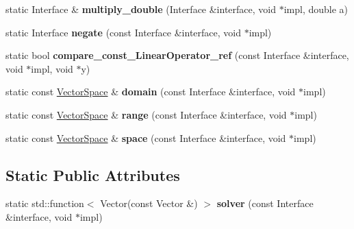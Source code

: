 \begin{DoxyCompactItemize}
\item 
\hypertarget{structSpacy_1_1LinearOperatorDetail_1_1execution__wrapper_a93d0107c1b355db394bc23307cb09781}{static \-Interface \& {\bfseries multiply\-\_\-double} (\-Interface \&interface, void $\ast$impl, double a)}\label{structSpacy_1_1LinearOperatorDetail_1_1execution__wrapper_a93d0107c1b355db394bc23307cb09781}

\item 
\hypertarget{structSpacy_1_1LinearOperatorDetail_1_1execution__wrapper_a039695797eecc3ae987476ab6671ec73}{static \-Interface {\bfseries negate} (const \-Interface \&interface, void $\ast$impl)}\label{structSpacy_1_1LinearOperatorDetail_1_1execution__wrapper_a039695797eecc3ae987476ab6671ec73}

\item 
\hypertarget{structSpacy_1_1LinearOperatorDetail_1_1execution__wrapper_a76b4beabb432d9d44b00b3101b0916cd}{static bool {\bfseries compare\-\_\-const\-\_\-\-Linear\-Operator\-\_\-ref} (const \-Interface \&interface, void $\ast$impl, void $\ast$y)}\label{structSpacy_1_1LinearOperatorDetail_1_1execution__wrapper_a76b4beabb432d9d44b00b3101b0916cd}

\item 
\hypertarget{structSpacy_1_1LinearOperatorDetail_1_1execution__wrapper_af399fe773d80064fb42df2cdb698a691}{static const \hyperlink{classSpacy_1_1VectorSpace}{\-Vector\-Space} \& {\bfseries domain} (const \-Interface \&interface, void $\ast$impl)}\label{structSpacy_1_1LinearOperatorDetail_1_1execution__wrapper_af399fe773d80064fb42df2cdb698a691}

\item 
\hypertarget{structSpacy_1_1LinearOperatorDetail_1_1execution__wrapper_a7dbc5be89f82be0bbfdf4e97e09e2f44}{static const \hyperlink{classSpacy_1_1VectorSpace}{\-Vector\-Space} \& {\bfseries range} (const \-Interface \&interface, void $\ast$impl)}\label{structSpacy_1_1LinearOperatorDetail_1_1execution__wrapper_a7dbc5be89f82be0bbfdf4e97e09e2f44}

\item 
\hypertarget{structSpacy_1_1LinearOperatorDetail_1_1execution__wrapper_ad3a4e5816293f10844ced1ad1f805280}{static const \hyperlink{classSpacy_1_1VectorSpace}{\-Vector\-Space} \& {\bfseries space} (const \-Interface \&interface, void $\ast$impl)}\label{structSpacy_1_1LinearOperatorDetail_1_1execution__wrapper_ad3a4e5816293f10844ced1ad1f805280}

\end{DoxyCompactItemize}
\subsection*{\-Static \-Public \-Attributes}
\begin{DoxyCompactItemize}
\item 
\hypertarget{structSpacy_1_1LinearOperatorDetail_1_1execution__wrapper_acedd4fc374d9ee55c18c9e2551bc1397}{static std\-::function$<$ \-Vector(const \*
\-Vector \&) $>$ {\bfseries solver} (const \-Interface \&interface, void $\ast$impl)}\label{structSpacy_1_1LinearOperatorDetail_1_1execution__wrapper_acedd4fc374d9ee55c18c9e2551bc1397}

\end{DoxyCompactItemize}
